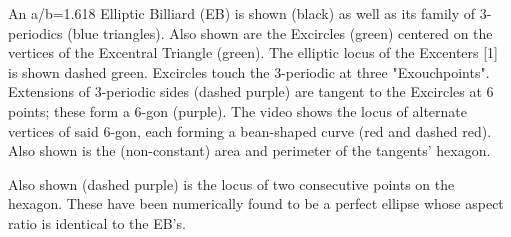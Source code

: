 An a/b=1.618 Elliptic Billiard (EB) is shown (black) as well as its family of 3-periodics (blue triangles). Also shown are the Excircles (green) centered on the vertices of the Excentral Triangle (green). The elliptic locus of the Excenters [1] is shown dashed green. Excircles touch the 3-periodic at three "Exouchpoints". Extensions of 3-periodic sides (dashed purple) are tangent to the Excircles at 6 points; these form a 6-gon (purple). The video shows the locus of alternate vertices of said 6-gon, each forming a bean-shaped curve (red and dashed red). Also shown is the (non-constant) area and perimeter of the tangents' hexagon.

Also shown (dashed purple) is the locus of two consecutive points on the hexagon. These have been numerically found to be a perfect ellipse whose aspect ratio is identical to the EB's.